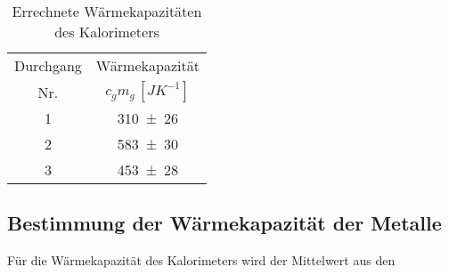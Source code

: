 	\begin{table}[!h]
		\centering
		\begin{tabular}{|c|c|}	
		\hline
			Durchgang & Wärmekapazität\\
			Nr.		  & $c_{g}m_{g}\,[\si{JK^{-1}}]$\\ \hline
			1& \num{310(26)}    \\    
			2& \num{583(30)}	  \\
			3& \num{453(28)}   \\
			\hline
		\end{tabular}
		\caption{Errechnete Wärmekapazitäten des Kalorimeters}
	\end{table}
	
	
	 
\subsection{Bestimmung der Wärmekapazität der Metalle}\label{sec:WärmekapMetalle}
	
	
	
	Für die Wärmekapazität des Kalorimeters wird der Mittelwert aus den


